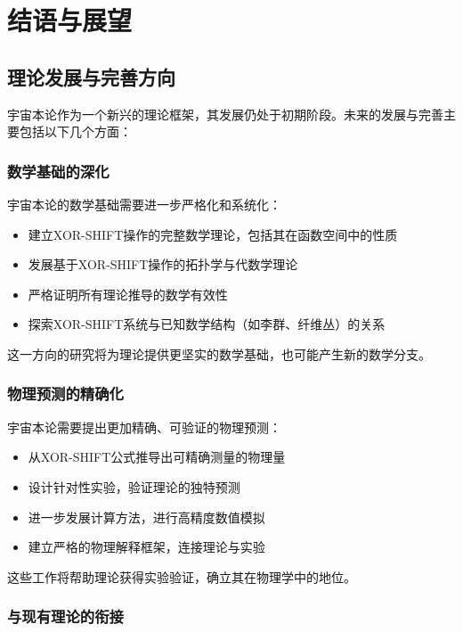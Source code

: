 \chapter{结语与展望}

\section{理论发展与完善方向}

宇宙本论作为一个新兴的理论框架，其发展仍处于初期阶段。未来的发展与完善主要包括以下几个方面：

\subsection{数学基础的深化}

宇宙本论的数学基础需要进一步严格化和系统化：

\begin{itemize}
  \item 建立XOR-SHIFT操作的完整数学理论，包括其在函数空间中的性质
  \item 发展基于XOR-SHIFT操作的拓扑学与代数学理论
  \item 严格证明所有理论推导的数学有效性
  \item 探索XOR-SHIFT系统与已知数学结构（如李群、纤维丛）的关系
\end{itemize}

这一方向的研究将为理论提供更坚实的数学基础，也可能产生新的数学分支。

\subsection{物理预测的精确化}

宇宙本论需要提出更加精确、可验证的物理预测：

\begin{itemize}
  \item 从XOR-SHIFT公式推导出可精确测量的物理量
  \item 设计针对性实验，验证理论的独特预测
  \item 进一步发展计算方法，进行高精度数值模拟
  \item 建立严格的物理解释框架，连接理论与实验
\end{itemize}

这些工作将帮助理论获得实验验证，确立其在物理学中的地位。

\subsection{与现有理论的衔接}

